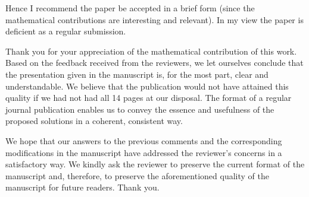 \begin{reviewer}
Hence I recommend the paper be accepted in a brief form (since the mathematical
contributions are interesting and relevant). In my view the paper is deficient
as a regular submission.
\end{reviewer}

\begin{authors}
Thank you for your appreciation of the mathematical contribution of this work.
Based on the feedback received from the reviewers, we let ourselves conclude
that the presentation given in the manuscript is, for the most part, clear and
understandable. We believe that the publication would not have attained this
quality if we had not had all 14 pages at our disposal. The format of a regular
journal publication enables us to convey the essence and usefulness of the
proposed solutions in a coherent, consistent way.

We hope that our answers to the previous comments and the corresponding
modifications in the manuscript have addressed the reviewer's concerns in a
satisfactory way. We kindly ask the reviewer to preserve the current format of
the manuscript and, therefore, to preserve the aforementioned quality of the
manuscript for future readers. Thank you.
\end{authors}
